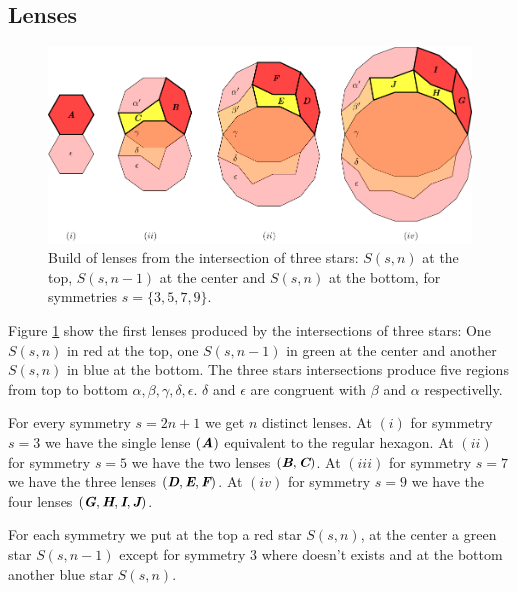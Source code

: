 \documentclass[11pt]{article}
\def\mathbi#1{\textbf{\em #1}}
\begin{document}
\subsection{Lenses}

\begin{figure}[H]
\centering
\includegraphics[scale=1]{stars/inter-2}
\caption{Build of lenses from the intersection of three stars: $S(s,n)$ at the top, $S(s,n-1)$ at the center and $S(s,n)$ at the bottom, for symmetries $s=\{3,5,7,9\}$.}
\label{fig:stars-inter-2}
\end{figure}

Figure \ref{fig:stars-inter-2} show the first lenses produced by the intersections of three stars: One $S(s,n)$ in red at the top, one $S(s,n-1)$ in green at the center and another $S(s,n)$ in blue at the bottom. The three stars intersections produce five regions from top to bottom $\alpha,\beta,\gamma,\delta,\epsilon$. $\delta$ and $\epsilon$ are congruent with $\beta$ and $\alpha$ respectivelly.

For every symmetry $s=2n+1$ we get $n$ distinct lenses. At $(i)$ for symmetry $s=3$ we have the single lense $(\mathbi{A})$ equivalent to the regular hexagon. At $(ii)$ for symmetry $s=5$ we have the two lenses $(\mathbi{B},\mathbi{C})$. At $(iii)$ for symmetry $s=7$ we have the three lenses $(\mathbi{D},\mathbi{E},\mathbi{F})$. At $(iv)$ for symmetry $s=9$ we have the four lenses $(\mathbi{G},\mathbi{H},\mathbi{I},\mathbi{J})$.


For each symmetry we put at the top a red star $S(s,n)$, at the center a green star $S(s,n-1)$ except for symmetry $3$ where doesn't exists and at the bottom another blue star $S(s,n)$.
\end{document}
